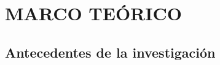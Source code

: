 \documentclass[]{article}
\begin{document}
\begin{table}[ht]
\begin{center}
\begin{tabular}{>{\centering}m{2.4cm} m{2.2cm}m{2.2cm}m{2cm}m{2.2cm}m{1.7cm}m{1.5cm}m{1.6cm} @{}m{0pt}@{} }


\end{tabular}
\hspace*{-1cm}
\end{center}
        \label{tab:opera}
\end{table}

\section{MARCO TEÓRICO}\label{marco-teorico}

\subsection{Antecedentes de la
investigación}\label{antecedentes-de-la-investigacion}
\end{document}
